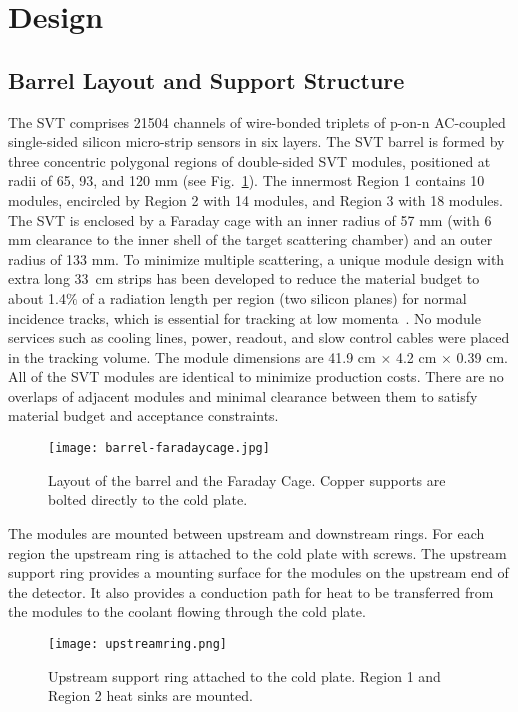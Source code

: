 \section{Design}

\subsection{Barrel Layout and Support Structure}

The SVT comprises 21504 channels of wire-bonded triplets of p-on-n AC-coupled single-sided silicon micro-strip sensors in six layers. The SVT barrel is formed by three concentric polygonal regions of double-sided SVT modules, positioned at radii of 65, 93, and 120 mm (see Fig.~\ref{fig:barrel-faradaycage}). The innermost Region 1 contains 10 modules, encircled by Region 2 with 14 modules, and Region 3 with 18 modules. The SVT is enclosed by a Faraday cage with an inner radius of 57 mm (with 6 mm clearance to the inner shell of the target scattering chamber) and an outer radius of 133 mm. To minimize multiple scattering, a unique module design with extra long 33~cm strips has been developed to reduce the material budget to about 1.4$\%$ of a radiation length per region (two silicon planes) for normal incidence tracks, which is essential for tracking at low momenta~\cite{Vertex2016}. No module services such as cooling lines, power, readout, and slow control cables were placed in the tracking volume. The module dimensions are 41.9 cm $\times$ 4.2 cm $\times$ 0.39 cm. All of the SVT modules are identical to minimize production costs. There are no overlaps of adjacent modules and minimal clearance between them to satisfy material budget and acceptance constraints.

\begin{figure}[h] 
\centering 
\texttt{[image: barrel-faradaycage.jpg]}
\caption{Layout of the barrel and the Faraday Cage. Copper supports are bolted directly to the cold plate.}
\label{fig:barrel-faradaycage}
\end{figure}

The modules  are mounted between upstream and downstream rings. For each region the upstream ring is attached to the cold plate with screws. The upstream support ring provides a mounting surface for the modules on the upstream end of the detector. It also provides a conduction path for heat to be transferred from the modules to the coolant flowing through the cold plate. 

\begin{figure}[h] 
\centering 
\texttt{[image: upstreamring.png]}
\caption{Upstream support ring attached to the cold plate. Region 1 and Region 2 heat sinks are mounted.}
\label{fig:upstreamring}
\end{figure}

